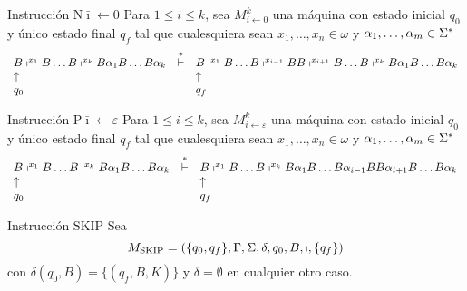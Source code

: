 \begin{frame}
  \begin{block}{Instrucción $\mathrm{N}\bar{\imath} \leftarrow 0$}
    \PN Para $1 \leq i \leq k$, sea $M_{i \leftarrow 0}^{k}$ una máquina con estado inicial $q_{0}$ y único estado final
    $q_{f}$ tal que cualesquiera sean $x_{1}, \dotsc, x_{n} \in \omega$ y $\alpha_{1}, \dotsc,\alpha_{m} \in \Sigma^{\ast}$
    \minLetter
    \[
      \begin{array}{lcl}
        B \shortmid^{x_{1}} B \dotsc B \shortmid^{x_{k}} B \alpha_{1} B \dotsc B \alpha_{k} &\overset{\ast}{\vdash}& B
          \shortmid^{x_{1}} B \dotsc B \shortmid^{x_{i-1}} B B \shortmid^{x_{i+1}} B \dotsc B \shortmid^{x_{k}} B
          \alpha_{1} B \dotsc B \alpha_{k} \\
        \uparrow && \uparrow \\
        q_{0} & & q_{f}
      \end{array}
    \]
  \end{block}

  \begin{block}{Instrucción $\mathrm{P}\bar{\imath} \leftarrow \varepsilon$}
    \PN Para $1 \leq i \leq k$, sea $M_{i \leftarrow \varepsilon}^{k}$ una máquina con estado inicial $q_{0}$ y único
    estado final $q_{f}$ tal que cualesquiera sean $x_{1}, \dotsc, x_{n} \in \omega$ y $\alpha_{1}, \dotsc,\alpha_{m}
    \in \Sigma^{\ast}$
    \minLetter
    \[
      \begin{array}{lcl}
        B \shortmid^{x_{1}} B \dotsc B \shortmid^{x_{k}} B \alpha_{1} B \dotsc B \alpha_{k} &\overset{\ast}{\vdash}& B
          \shortmid^{x_{1}} B \dotsc B \shortmid^{x_{k}} B \alpha_{1} B \dotsc B \alpha_{i-1} B B \alpha_{i+1} B \dotsc
          B \alpha_{k} \\
        \uparrow && \uparrow \\
        q_{0} & & q_{f}
      \end{array}
    \]
  \end{block}

  \begin{block}{Instrucción $\mathrm{SKIP}$}
    \PN Sea
    \begin{equation*}
      M_{\mathrm{SKIP}} = \left(\{q_{0}, q_{f}\}, \Gamma, \Sigma, \delta, q_{0}, B, \shortmid, \{q_{f}\}\right)
    \end{equation*}
    \PN con $\delta(q_{0}, B) = \{(q_{f}, B, K)\}$ y $\delta = \emptyset$ en cualquier otro caso.
  \end{block}
\end{frame}
